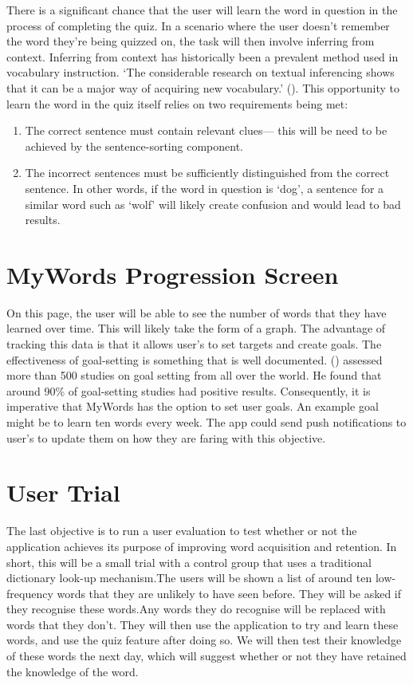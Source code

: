 There is a significant chance that the user will learn the word in question in the process of completing the quiz.  In a scenario where the user doesn't remember the word they're being quizzed on, the task will then involve inferring from context. Inferring from context has historically been a prevalent method used in vocabulary instruction. `The considerable research on textual inferencing shows that it can be a major way of acquiring new vocabulary.’ (\cite{schmitt1997vocabulary}). This opportunity to learn the word in the quiz itself relies on two requirements being met:

\begin{enumerate}
    \item The correct sentence must contain relevant clues--- this will be need to be achieved by the sentence-sorting component.
    \item The incorrect sentences must be sufficiently distinguished from the correct sentence. In other words, if the word in question is `dog', a sentence for a similar word such as `wolf' will likely create confusion and would lead to bad results.
\end{enumerate}

\section{MyWords Progression Screen}

On this page, the user will be able to see the number of words that they have learned over time. This will likely take the form of a graph. The advantage of tracking this data is that it allows user's to set targets and create goals. The effectiveness of goal-setting is something that is well documented. (\cite{locke2000motivation}) assessed more than 500 studies on goal setting from all over the world. He found that around 90\% of goal-setting studies had positive results. Consequently, it is imperative that MyWords has the option to set user goals. An example goal might be to learn ten words every week. The app could send push notifications to user's to update them on how they are faring with this objective.

\section{User Trial}

The last objective is to run a user evaluation to test whether or not the application achieves its purpose of improving word acquisition and retention.  In short, this will be a small trial with a control group that uses a traditional dictionary look-up mechanism.The users will be shown a list of around ten low-frequency words that they are unlikely to have seen before.  They will be asked if they recognise these words.Any words they do recognise will be replaced with words that they don’t.  They will then use the application to try and learn these words, and use the quiz feature after doing so.  We will then test their knowledge of these words the next day, which will suggest whether or not they have retained the knowledge of the word.
